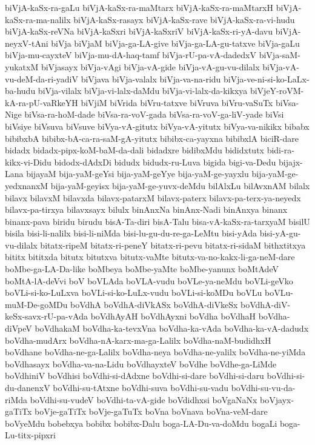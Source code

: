 {biVjA-kaSx-ra-gaLu
biVjA-kaSx-ra-maMtarx
biVjA-kaSx-ra-maMtarxH
biVjA-kaSx-ra-ma-nalilx
biVjA-kaSx-rasayx
biVjA-kaSx-rave
biVjA-kaSx-ra-vi-hudu
biVjA-kaSx-reVNa
biVjA-kaSxri
biVjA-kaSxriV
biVjA-kaSx-ri-yA-davu
biVjA-neyxV-tAni
biVja
biVjaM
biVja-ga-LA-give
biVja-ga-LA-gu-tatxve
biVja-gaLu
biVja-mu-cayxteV
biVja-mu-dA-haq-tamf
biVja-rU-pa-vA-dadedxV
biVja-saM-yukatxM
biVjasayx
biVja-vAgi
biVja-vA-gide
biVja-vA-gu-vu-dilalx
biVja-vA-vu-deM-da-ri-yadiV
biVjava
biVja-valalx
biVja-va-na-ridu
biVja-ve-ni-si-ko-LaLx-ba-hudu
biVja-vilalx
biVja-vi-lalx-daMdu
biVja-vi-lalx-da-kikxya
biVjeY-roVM-kA-ra-pU-vaRkeYH
biVjiM
biVrida
biVru-tatxve
biVruva
biVru-vaSuTx
biVsa-Nige
biVsa-ra-hoM-dade
biVsa-ra-voV-gada
biVsa-ra-voV-ga-liV-yade
biVsi
biVsiye
biVsuva
biVsuve
biVya-vA-gitutx
biVya-vA-yitutx
biVya-va-nikikx
bibabx
bibibxbA
bibibx-bA-ca-ra-saM-gA-yitutx
bibibx-ca-yayxna
bibibxlA
biciR-dare
bidadx
bidadx-pipx-koM-baM-da-dali
bidadxre
bidibxMdu
bididxtutx
bidi-ra-kikx-vi-Didu
bidodx-dAdxDi
bidudx
bidudx-ru-Luva
bigida
bigi-va-Dedu
bijajx-Lana
bijayaM
bija-yaM-geYsi
bija-yaM-geYye
bija-yaM-ge-yayxlu
bija-yaM-ge-yedxnanxM
bija-yaM-geyisx
bija-yaM-ge-yuvx-deMdu
bilAlxLu
bilAvxnAM
bilalx
bilavx
bilavxM
bilavxda
bilavx-patarxM
bilavx-paterx
bilavx-pa-terx-ya-neyedx
bilavx-pa-tirxya
bilavxsayx
bilulx
binAnxNa
binAnx-Nadi
binAnxya
binanx
binanx-pava
biridu
birudu
bisA-Ta-diri
bisA-Talu
bisa-vA-kaSx-ra-tarxyaM
bisilU
bisila
bisi-li-nalilx
bisi-li-niMda
bisi-lu-gu-du-re-ga-LeMtu
bisi-yAda
bisi-yA-gu-vu-dilalx
bitatx-ripeM
bitatx-ri-peneY
bitatx-ri-pevu
bitatx-ri-sidaM
bithxtitxya
bititx
bititxda
bitutx
bitutxva
bitutx-vaMte
bitutx-va-no-kakx-li-ga-neM-dare
boMbe-ga-LA-Da-like
boMbeya
boMbe-yaMte
boMbe-yanunx
boMtAdeV
boMtA-lA-deVvi
boV
boVLAda
boVLA-vudu
boVLe-ya-neMdu
boVLi-geVko
boVLi-si-ko-LuLxva
boVLi-si-ko-LuLx-vudu
boVLi-si-koMDu
boVLu
boVLu-muM-De-goMDu
boVdhA
boVdhA-diVkASx
boVdhA-diVkeSx
boVdhA-diV-keSx-savx-rU-pa-vAda
boVdhAyAH
boVdhAyxni
boVdha
boVdhaH
boVdha-diVpeV
boVdhakaM
boVdha-ka-tevxVna
boVdha-ka-vAda
boVdha-ka-vA-dadudx
boVdha-mudArx
boVdha-nA-karx-ma-ga-Lalilx
boVdha-naM-budidhxH
boVdhane
boVdha-ne-ga-Lalilx
boVdha-neya
boVdha-ne-yalilx
boVdha-ne-yiMda
boVdhasayx
boVdha-va-na-Lidu
boVdhayxteV
boVdhe
boVdhe-ga-LiMde
boVdhiniV
boVdhisi
boVdhi-si-dAdxne
boVdhi-si-dare
boVdhi-si-daru
boVdhi-si-du-danenxV
boVdhi-su-tAtxne
boVdhi-suva
boVdhi-su-vadu
boVdhi-su-vu-da-riMda
boVdhi-su-vudeV
boVdhi-ta-vA-gide
boVdidhxsi
boVgaNaNx
boVjayx-gaTiTx
boVje-gaTiTx
boVje-gaTuTx
boVna
boVnava
boVna-veM-dare
boVyeMdu
bobebxya
bobibx
bobibx-Dalu
boga-LA-Du-va-doMdu
bogaLi
boga-Lu-titx-pipxri
}
